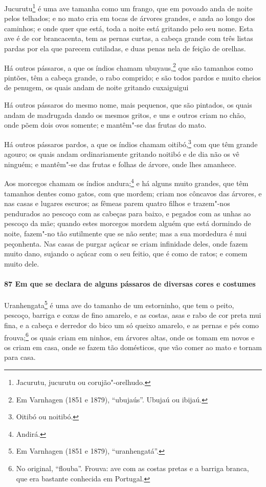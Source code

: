 \begin{linenumbers}
Jucurutu\footnote{ Jacurutu, jucurutu ou corujão"-orelhudo.} é uma ave tamanha como um
frango, que em povoado anda de noite pelos telhados; e no mato cria em tocas de árvores
grandes, e anda ao longo dos caminhos; e onde quer que está, toda a noite está gritando
pelo seu nome. Esta ave é de cor brancacenta, tem as pernas curtas, a cabeça grande com
três listas pardas por ela que parecem cutiladas, e duas penas nela de feição de orelhas.

Há outros pássaros, a que os índios chamam ubuyaus,\footnote{ Em Varnhagen (1851 e 1879),
``ubujaús''. Ubujaú ou ibijaú.} que são tamanhos como pintões, têm a cabeça grande, o
rabo comprido; e são todos pardos e muito cheios de penugem, os quais andam de noite
gritando cuxaiguigui

Há outros pássaros do mesmo nome, mais pequenos, que são pintados, os quais andam de
madrugada dando os mesmos gritos, e uns e outros criam no chão, onde põem dois ovos
somente; e mantêm"-se das frutas do mato.

Há outros pássaros pardos, a que os índios chamam oitibó,\footnote{ Oitibó ou noitibó.}
com que têm grande agouro; os quais andam ordinariamente gritando noitibó e de dia não os
vê ninguém; e mantêm"-se das frutas e folhas de árvore, onde lhes amanhece.

Aos morcegos chamam os índios andura;\footnote{ Andirá.} e há alguns muito grandes, que
têm tamanhos dentes como gatos, com que mordem; criam nos côncavos das árvores, e nas
casas e lugares escuros; as fêmeas parem quatro filhos e trazem"-nos pendurados ao pescoço
com as cabeças para baixo, e pegados com as unhas ao pescoço da mãe; quando estes morcegos
mordem alguém que está dormindo de noite, fazem"-no tão sutilmente que se não sente; mas a
sua mordedura é mui peçonhenta. Nas casas de purgar açúcar se criam infinidade deles, onde
fazem muito dano, sujando o açúcar com o seu feitio, que é como de ratos; e comem muito
dele.

\paragraph{87 Em que se declara de alguns pássaros de diversas cores e costumes}\quad
Uranhengata\footnote{ Em Varnhagen (1851 e 1879), ``uranhengatá''.} é uma ave do tamanho
de um estorninho, que tem o peito, pescoço, barriga e coxas de fino amarelo, e as costas,
asas e rabo de cor preta mui fina, e a cabeça e derredor do bico um só queixo amarelo, e
as pernas e pés como frouva;\footnote{ No original, ``flouba''. Frouva: ave com as costas
pretas e a barriga branca, que era bastante conhecida em Portugal.} os quais criam em
ninhos, em árvores altas, onde os tomam em novos e os criam em casa, onde se fazem tão
domésticos, que vão comer ao mato e tornam para casa.


\end{linenumbers}
